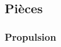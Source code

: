 \documentclass[11pt,a4paper]{article}
\begin{document}
    
    
    
    \subsection{Pièces}
    
      \subsubsection{Propulsion}
%           
%           
\end{document}
